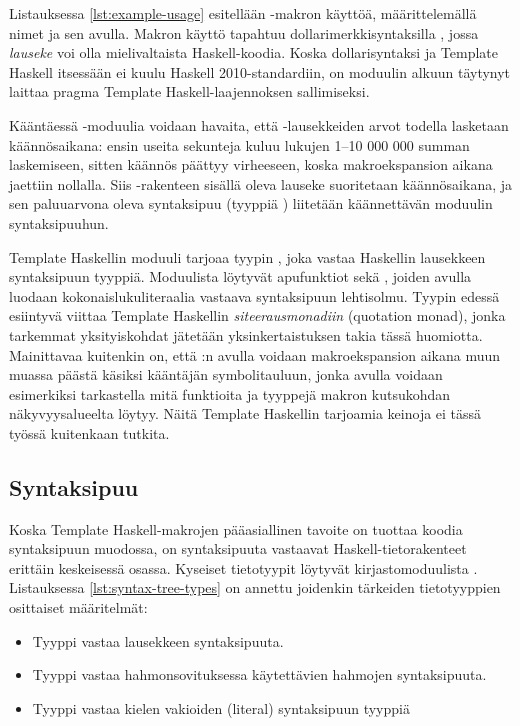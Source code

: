 Listauksessa \ref{lst:example-usage} esitellään -makron käyttöä,
mää\-rit\-tele\-mäl\-lä nimet  ja  sen avulla.
Makron käyttö tapahtuu dollarimerkkisyntaksilla ,
jossa \emph{lauseke} voi olla mielivaltaista Haskell-koodia.
Koska dollarisyntaksi ja Template Haskell itsessään ei kuulu Haskell 2010-standardiin,
on moduulin alkuun täytynyt laittaa pragma 
Template Haskell-laajennoksen sallimiseksi.

Kääntäessä -moduulia voidaan havaita,
että -lausekkeiden arvot todella lasketaan käännösaikana:
ensin useita sekunteja kuluu lukujen 1--10 000 000 summan laskemiseen,
sitten käännös päättyy virheeseen,
koska makroekspansion aikana jaettiin nollalla.
Siis \Haskell{\$()}-rakenteen sisällä oleva lauseke suoritetaan käännösaikana,
ja sen paluuarvona oleva syntaksipuu (tyyppiä ) liitetään käännettävän moduulin
syntaksipuuhun.

Template Haskellin moduuli  tarjoaa tyypin ,
joka vastaa Haskellin lausekkeen syntaksipuun tyyppiä.
Moduulista  löytyvät apufunktiot 
sekä ,
joiden avulla luodaan kokonaislukuliteraalia vastaava syntaksipuun lehtisolmu.
Tyypin  edessä esiintyvä  viittaa Template Haskellin
\emph{siteerausmonadiin} (quotation monad),
jonka tarkemmat yksityiskohdat jätetään yksinkertaistuksen takia tässä huomiotta.
Mainittavaa kuitenkin on,
että :n avulla voidaan makroekspansion aikana muun muassa päästä käsiksi kääntäjän symbolitauluun,
jonka avulla voidaan esimerkiksi tarkastella mitä funktioita ja tyyppejä makron kutsukohdan näkyvyysalueelta
löytyy. Näitä Template Haskellin tarjoamia keinoja ei tässä työssä kuitenkaan tutkita.

\subsection{Syntaksipuu}
Koska Template Haskell-makrojen pääasiallinen tavoite on tuottaa koodia syntaksipuun muodossa,
on syntaksipuuta vastaavat Haskell-tietorakenteet erittäin keskeisessä osassa.
Kyseiset tietotyypit löytyvät kirjastomoduulista .
Listauksessa \ref{lst:syntax-tree-types} on annettu joidenkin tärkeiden tietotyyppien
osittaiset määritelmät:
\begin{itemize}
    \item Tyyppi  vastaa lausekkeen syntaksipuuta.
    \item Tyyppi  vastaa hahmonsovituksessa käytettävien hahmojen syntaksipuuta.
    \item Tyyppi  vastaa kielen vakioiden (literal) syntaksipuun tyyppiä
\end{itemize}

